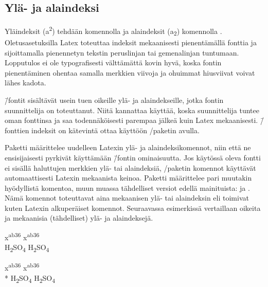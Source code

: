 \subsection{Ylä- ja alaindeksi}

Yläindeksit (a\textsuperscript{2}) tehdään komennolla  ja alaindeksit (a\textsubscript{2}) komennolla
. Oletusasetuksilla Latex toteuttaa
indeksit mekaanisesti pienentämällä fonttia ja sijoittamalla pienennetyn
tekstin peruslinjan tai gemenalinjan tuntumaan. Lopputulos ei ole
typografisesti välttämättä kovin hyvä, koska fontin pienentäminen
ohentaa samalla merkkien viivoja ja ohuimmat hiusviivat voivat lähes
kadota.

 \=/fontit sisältävät usein tuen oikeille ylä- ja
alaindekseille, jotka fontin suunnittelija on toteuttanut. Niitä
kannattaa käyttää, koska suunnittelija tuntee oman fonttinsa ja saa
todennäköisesti parempaa jälkeä kuin Latex mekaanisesti.  \=/fonttien indeksit on kätevintä ottaa käyttöön
\-/paketin avulla.

Paketti  määrittelee uudelleen Latexin ylä- ja
alaindeksikomennot, niin että ne ensisijaisesti pyrkivät käyttämään
 \=/fontin ominaisuutta. Jos käytössä oleva fontti
ei sisällä haluttujen merkkien ylä- tai alaindeksiä,
\-/paketin komennot käyttävät automaattisesti
Latexin mekaanista keinoa. Paketti määrittelee pari muutakin hyödyllistä
komentoa, muun muassa tähdelliset versiot edellä mainituista:
 ja . Nämä komennot toteuttavat aina mekaanisen ylä-
tai alaindeksin eli toimivat kuten Latexin alkuperäiset komennot.
Seuraavassa esimerkissä vertaillaan oikeita ja mekaanisia (tähdelliset)
ylä- ja alaindeksejä.

\pagebreak[3]

\begin{koodilohkosis}
  x\textsuperscript {ab36}
  x\textsuperscript*{ab36} \\
  H\textsubscript {2}SO\textsubscript {4}
  H\textsubscript*{2}SO\textsubscript*{4}
\end{koodilohkosis}

\begin{tulossis}
  \erikoisfontti
  x\textsuperscript {ab36}
  x\textsuperscript*{ab36} \\*
  H\textsubscript {2}SO\textsubscript {4}
  H\textsubscript*{2}SO\textsubscript*{4}
\end{tulossis}

